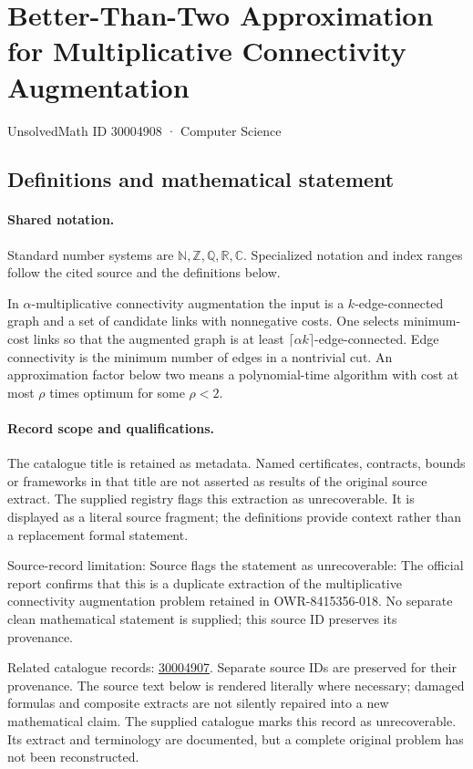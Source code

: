 \documentclass[11pt]{article}
\begin{document}
\setcounter{section}{30004907}
\section{Better-Than-Two Approximation for Multiplicative Connectivity Augmentation}\label{30004908}
{\small\sffamily UnsolvedMath ID 30004908 · Computer Science}
\subsection{Definitions and mathematical statement}

\paragraph{Shared notation.}Standard number systems are $\mathbb N,\mathbb Z,\mathbb Q,\mathbb R,\mathbb C$. Specialized notation and index ranges follow the cited source and the definitions below.


In $\alpha$-multiplicative connectivity augmentation the input is a $k$-edge-connected graph and a set of candidate links with nonnegative costs. One selects minimum-cost links so that the augmented graph is at least $\lceil\alpha k\rceil$-edge-connected. Edge connectivity is the minimum number of edges in a nontrivial cut. An approximation factor below two means a polynomial-time algorithm with cost at most $\rho$ times optimum for some $\rho<2$.
\paragraph{Record scope and qualifications.}
The catalogue title is retained as metadata. Named certificates, contracts, bounds or frameworks in that title are not asserted as results of the original source extract.
The supplied registry flags this extraction as unrecoverable. It is displayed as a literal source fragment; the definitions provide context rather than a replacement formal statement.

Source-record limitation: Source flags the statement as unrecoverable: The official report confirms that this is a duplicate extraction of the multiplicative connectivity augmentation problem retained in OWR-8415356-018. No separate clean mathematical statement is supplied; this source ID preserves its provenance.

Related catalogue records: \href{https://mehmetmars7.github.io/Erdosproblems-llm-hunter/problem.html?type=open_problems&id=30004907}{30004907}. Separate source IDs are preserved for their provenance.
The source text below is rendered literally where necessary; damaged formulas and composite extracts are not silently repaired into a new mathematical claim.
The supplied catalogue marks this record as unrecoverable. Its extract and terminology are documented, but a complete original problem has not been reconstructed.
\end{document}
